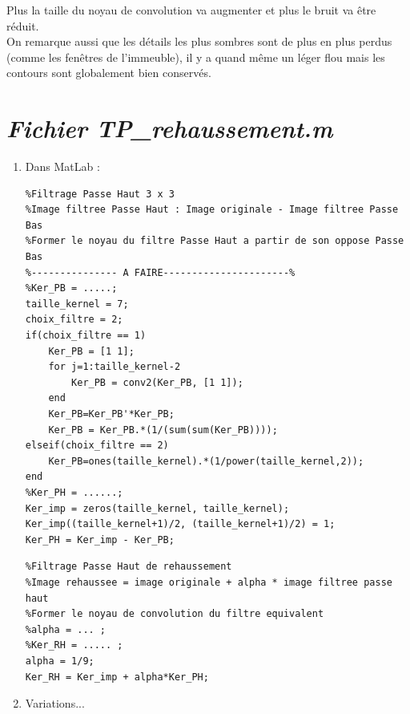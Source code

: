 \documentclass{article}
\begin{document}
\begin{enumerate}[label=\arabic*$\degres$)]
Plus la taille du noyau de convolution va augmenter et plus le bruit va être réduit.\\

On remarque aussi que les détails les plus sombres sont de plus en plus perdus (comme les fenêtres de l'immeuble), il y a quand même un léger flou mais les contours sont globalement bien conservés.

\end{enumerate}

\section*{\it{\textbf{Fichier TP\_rehaussement.m}}}
\begin{enumerate}[label=\arabic*$\degres$)]
	\item Dans MatLab :
\begin{lstlisting}
%Filtrage Passe Haut 3 x 3
%Image filtree Passe Haut : Image originale - Image filtree Passe Bas 
%Former le noyau du filtre Passe Haut a partir de son oppose Passe Bas
%--------------- A FAIRE----------------------%
%Ker_PB = .....; 
taille_kernel = 7;
choix_filtre = 2;
if(choix_filtre == 1)
    Ker_PB = [1 1];
    for j=1:taille_kernel-2
        Ker_PB = conv2(Ker_PB, [1 1]);
    end
    Ker_PB=Ker_PB'*Ker_PB;
    Ker_PB = Ker_PB.*(1/(sum(sum(Ker_PB))));
elseif(choix_filtre == 2)
    Ker_PB=ones(taille_kernel).*(1/power(taille_kernel,2));
end
%Ker_PH = ......;
Ker_imp = zeros(taille_kernel, taille_kernel);
Ker_imp((taille_kernel+1)/2, (taille_kernel+1)/2) = 1;
Ker_PH = Ker_imp - Ker_PB;
\end{lstlisting}
\begin{lstlisting}
%Filtrage Passe Haut de rehaussement 
%Image rehaussee = image originale + alpha * image filtree passe haut
%Former le noyau de convolution du filtre equivalent
%alpha = ... ; 
%Ker_RH = ..... ; 
alpha = 1/9;
Ker_RH = Ker_imp + alpha*Ker_PH;
\end{lstlisting}

	\item Variations...
\end{enumerate}
\end{document}
